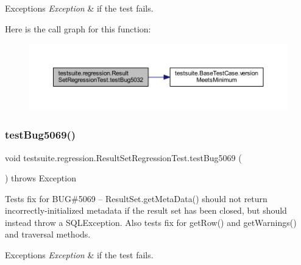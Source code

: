\begin{DoxyExceptions}{Exceptions}
{\em Exception} & if the test fails. \\
\hline
\end{DoxyExceptions}
Here is the call graph for this function\+:
\nopagebreak
\begin{figure}[H]
\begin{center}
\leavevmode
\includegraphics[width=350pt]{classtestsuite_1_1regression_1_1_result_set_regression_test_a647daf219a6f3bba85706fa0aad0ca76_cgraph}
\end{center}
\end{figure}
\mbox{\label{classtestsuite_1_1regression_1_1_result_set_regression_test_a3fc2285158514cb2ab7dcc1e3880113b}} 
\subsubsection{\texorpdfstring{test\+Bug5069()}{testBug5069()}}
{\footnotesize\ttfamily void testsuite.\+regression.\+Result\+Set\+Regression\+Test.\+test\+Bug5069 (\begin{DoxyParamCaption}{ }\end{DoxyParamCaption}) throws Exception}

Tests fix for B\+UG\#5069 -- Result\+Set.\+get\+Meta\+Data() should not return incorrectly-\/initialized metadata if the result set has been closed, but should instead throw a S\+Q\+L\+Exception. Also tests fix for get\+Row() and get\+Warnings() and traversal methods.


\begin{DoxyExceptions}{Exceptions}
{\em Exception} & if the test fails. \\
\hline
\end{DoxyExceptions}
\mbox{\label{classtestsuite_1_1regression_1_1_result_set_regression_test_a9f4b082f0411dbf1f533998671d080cd}} 
